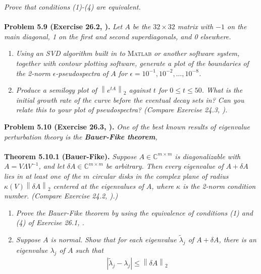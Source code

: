 \documentclass[a4paper,oneside]{book}
\numberwithin{equation}{chapter}
\begin{document}
\textit{Prove that conditions (1)-(4) are equivalent.}\\
\\
\textbf{Problem 5.9 (Exercise 26.2, \cite{1}).} \textit{Let $A$ be the $32\times 32$ matrix with $-1$ on the main diagonal, 1 on the first and second superdiagonals, and 0 elsewhere.}
\begin{enumerate}
\item \textit{Using an SVD algorithm built in to}\textsc{ Matlab}\textit{ or another software system, together with contour plotting software, generate a plot of the boundaries of the 2-norm $\epsilon$-pseudospectra of $A$ for $\epsilon =10^{-1},10^{-2},\ldots,10^{-8}$.}
\item \textit{Produce a semilogy plot of $\left\|e^{tA}\right\| _2$ against $t$ for $0\le t\le 50$. What is the initial growth rate of the curve before the eventual decay sets in? Can you relate this to your plot of pseudospectra? (Compare Exercise 24.3, \cite{1}).}\end{enumerate}
\textbf{Problem 5.10 (Exercise 26.3, \cite{1}).} \textit{One of the best known results of eigenvalue perturbation theory is the \textbf{Bauer-Fike theorem},}\\
\\
\textbf{Theorem 5.10.1 (Bauer-Fike).} \textit{Suppose $A\in \mathbb{C}^{m\times m}$ is diagonalizable with $A = V\Lambda {V^{ - 1}}$, and let $\delta  A \in \mathbb{C}^{m\times m}$ be arbitrary. Then every eigenvalue of $A+\delta A$ lies in at least one of the $m$ circular disks in the complex plane of radius $\kappa \left( V \right){\left\| {\delta A} \right\|_2}$ centered at the eigenvalues of $A$, where $\kappa$ is the 2-norm condition number. (Compare Exercise 24.2, \cite{1}).)}
\begin{enumerate}
\item \textit{Prove the Bauer-Fike theorem by using the equivalence of conditions (1) and (4) of Exercise 26.1, \cite{1}.}
\item \textit{Suppose $A$ is normal. Show that for each eigenvalue $\tilde \lambda _j$ of $A+\delta A$, there is an eigenvalue $\lambda _j$ of $A$ such that}
\begin{align}
\left| {{{\tilde \lambda }_j} - {\lambda _j}} \right| \le {\left\| {\delta A} \right\|_2}
\end{align}
\end{enumerate}
\end{document}
